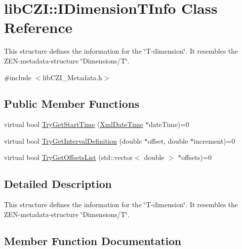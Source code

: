 \hypertarget{classlib_c_z_i_1_1_i_dimension_t_info}{}\section{lib\+C\+ZI\+:\+:I\+Dimension\+T\+Info Class Reference}
\label{classlib_c_z_i_1_1_i_dimension_t_info}


This structure defines the information for the \char`\"{}\+T-\/dimension\char`\"{}. It resembles the Z\+E\+N-\/metadata-\/structure \char`\"{}\+Dimensions/\+T\char`\"{}.  




{\ttfamily \#include $<$lib\+C\+Z\+I\+\_\+\+Metadata.\+h$>$}

\subsection*{Public Member Functions}
\begin{DoxyCompactItemize}
\item 
virtual bool \hyperlink{classlib_c_z_i_1_1_i_dimension_t_info_ab815fa3e2df4f4d8a243a45e843f9a17}{Try\+Get\+Start\+Time} (\hyperlink{structlib_c_z_i_1_1_xml_date_time}{Xml\+Date\+Time} $\ast$date\+Time)=0
\item 
virtual bool \hyperlink{classlib_c_z_i_1_1_i_dimension_t_info_a524fe50881aaf29353744500f1166158}{Try\+Get\+Interval\+Definition} (double $\ast$offset, double $\ast$increment)=0
\item 
virtual bool \hyperlink{classlib_c_z_i_1_1_i_dimension_t_info_a2c852321a0f26213096c571ccc5f7b65}{Try\+Get\+Offsets\+List} (std\+::vector$<$ double $>$ $\ast$offsets)=0
\end{DoxyCompactItemize}


\subsection{Detailed Description}
This structure defines the information for the \char`\"{}\+T-\/dimension\char`\"{}. It resembles the Z\+E\+N-\/metadata-\/structure \char`\"{}\+Dimensions/\+T\char`\"{}. 

\subsection{Member Function Documentation}
\mbox{\label{classlib_c_z_i_1_1_i_dimension_t_info_a524fe50881aaf29353744500f1166158}} 
